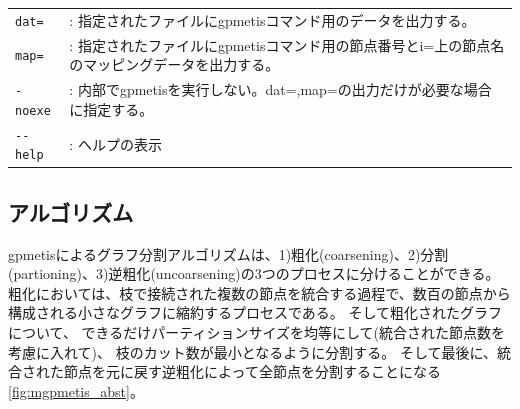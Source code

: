 \begin{table}[htbp]
{\begin{tabular}{ll}
\verb|dat=|   & : 指定されたファイルにgpmetisコマンド用のデータを出力する。 \\
\verb|map=|   & : 指定されたファイルにgpmetisコマンド用の節点番号とi=上の節点名のマッピングデータを出力する。 \\
\verb|-noexe| & : 内部でgpmetisを実行しない。dat=,map=の出力だけが必要な場合に指定する。\\


\verb|--help| & : ヘルプの表示 \\

\end{tabular} 
}
\end{table} 



\subsection{アルゴリズム}
gpmetisによるグラフ分割アルゴリズムは、1)粗化(coarsening)、2)分割(partioning)、3)逆粗化(uncoarsening)の3つのプロセスに分けることができる。
粗化においては、枝で接続された複数の節点を統合する過程で、数百の節点から構成される小さなグラフに縮約するプロセスである。
そして粗化されたグラフについて、
できるだけパーティションサイズを均等にして(統合された節点数を考慮に入れて)、
枝のカット数が最小となるように分割する。
そして最後に、統合された節点を元に戻す逆粗化によって全節点を分割することになる\ref{fig:mgpmetis_abst}。

